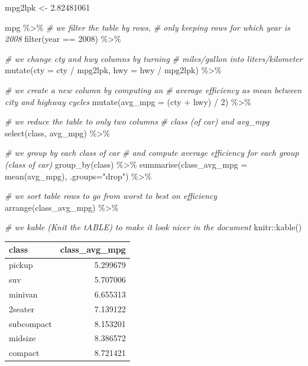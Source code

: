 \documentclass[
]{book}
\newenvironment{Shaded}{\begin{snugshade}}{\end{snugshade}}
\newcommand{\AttributeTok}[1]{\textcolor[rgb]{0.77,0.63,0.00}{#1}}
\newcommand{\CommentTok}[1]{\textcolor[rgb]{0.56,0.35,0.01}{\textit{#1}}}
\newcommand{\DecValTok}[1]{\textcolor[rgb]{0.00,0.00,0.81}{#1}}
\newcommand{\FloatTok}[1]{\textcolor[rgb]{0.00,0.00,0.81}{#1}}
\newcommand{\FunctionTok}[1]{\textcolor[rgb]{0.00,0.00,0.00}{#1}}
\newcommand{\NormalTok}[1]{#1}
\newcommand{\OtherTok}[1]{\textcolor[rgb]{0.56,0.35,0.01}{#1}}
\newcommand{\SpecialCharTok}[1]{\textcolor[rgb]{0.00,0.00,0.00}{#1}}
\newcommand{\StringTok}[1]{\textcolor[rgb]{0.31,0.60,0.02}{#1}}
\begin{document}
\begin{Shaded}
\begin{Highlighting}[]
\NormalTok{mpg2lpk }\OtherTok{\textless{}{-}} \FloatTok{2.82481061}

\NormalTok{mpg }\SpecialCharTok{\%\textgreater{}\%}
  \CommentTok{\# we filter the table by rows, }
  \CommentTok{\# only keeping rows for which year is 2008}
  \FunctionTok{filter}\NormalTok{(year }\SpecialCharTok{==} \DecValTok{2008}\NormalTok{) }\SpecialCharTok{\%\textgreater{}\%}
  
  \CommentTok{\# we change cty and hwy columns by turning}
  \CommentTok{\# miles/gallon into liters/kilometer}
  \FunctionTok{mutate}\NormalTok{(}\AttributeTok{cty =}\NormalTok{ cty }\SpecialCharTok{/}\NormalTok{ mpg2lpk,}
         \AttributeTok{hwy =}\NormalTok{ hwy }\SpecialCharTok{/}\NormalTok{ mpg2lpk) }\SpecialCharTok{\%\textgreater{}\%}
  
  \CommentTok{\# we create a new column by computing an }
  \CommentTok{\# average efficiency as mean between city and highway cycles}
  \FunctionTok{mutate}\NormalTok{(}\AttributeTok{avg\_mpg =}\NormalTok{ (cty }\SpecialCharTok{+}\NormalTok{ hwy) }\SpecialCharTok{/} \DecValTok{2}\NormalTok{) }\SpecialCharTok{\%\textgreater{}\%}
  
  \CommentTok{\# we reduce the table to only two columns}
  \CommentTok{\# class (of car) and avg\_mpg}
  \FunctionTok{select}\NormalTok{(class, avg\_mpg) }\SpecialCharTok{\%\textgreater{}\%}
  
  \CommentTok{\# we group by each class of car}
  \CommentTok{\# and compute average efficiency for each group (class of car)}
  \FunctionTok{group\_by}\NormalTok{(class) }\SpecialCharTok{\%\textgreater{}\%}
  \FunctionTok{summarise}\NormalTok{(}\AttributeTok{class\_avg\_mpg =} \FunctionTok{mean}\NormalTok{(avg\_mpg), }\AttributeTok{.groups=}\StringTok{"drop"}\NormalTok{) }\SpecialCharTok{\%\textgreater{}\%}
  
  \CommentTok{\# we sort table rows to go from worst to best on efficiency}
  \FunctionTok{arrange}\NormalTok{(class\_avg\_mpg) }\SpecialCharTok{\%\textgreater{}\%}
  
  \CommentTok{\# we kable (Knit the tABLE) to make it look nicer in the document}
\NormalTok{  knitr}\SpecialCharTok{::}\FunctionTok{kable}\NormalTok{()}
\end{Highlighting}
\end{Shaded}

\begin{tabular}{l|r}
\hline
class & class\_avg\_mpg\\
\hline
pickup & 5.299679\\
\hline
suv & 5.707006\\
\hline
minivan & 6.655313\\
\hline
2seater & 7.139122\\
\hline
subcompact & 8.153201\\
\hline
midsize & 8.386572\\
\hline
compact & 8.721421\\
\hline
\end{tabular}
\end{document}
